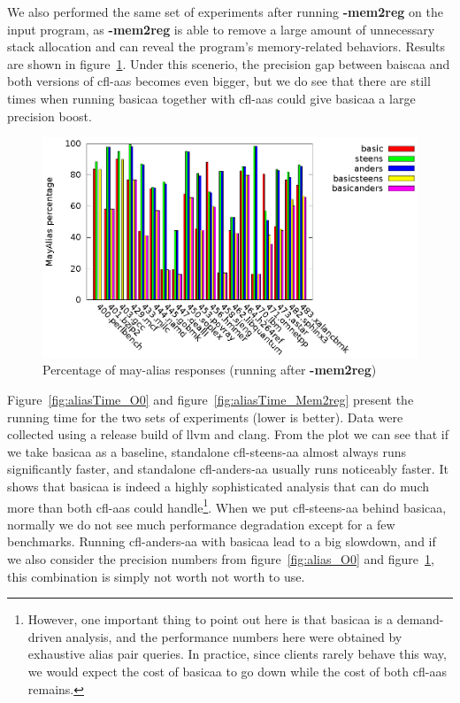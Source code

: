 \documentclass[10pt]{article}
\begin{document}
We also performed the same set of experiments after running \textbf{-mem2reg} on
the input program, as \textbf{-mem2reg} is able to remove a large amount of
unnecessary stack allocation and can reveal the program's memory-related
behaviors. Results are shown in
figure~\ref{fig:alias_Mem2reg}. Under this
scenerio, the precision gap between baiscaa and both versions of cfl-aas becomes
even bigger, but we do see that there are still times when running basicaa together
with cfl-aas could give basicaa a large precision boost.

\begin{figure}
  \centering
  \includegraphics[width=\linewidth]{result/alias/aliasMem2reg.eps}
  \caption{Percentage of may-alias responses (running after \textbf{-mem2reg})\label{fig:alias_Mem2reg}}
\end{figure}

Figure~\ref{fig:aliasTime_O0} and figure~\ref{fig:aliasTime_Mem2reg} present the
running time for the two sets of experiments (lower is better). Data were
collected using a release build of llvm and clang. From the plot we can see that if
we take basicaa as a baseline, standalone cfl-steens-aa almost always runs
significantly faster, and standalone cfl-anders-aa usually runs noticeably
faster. It shows that basicaa is indeed a highly sophisticated analysis that can
do much more than both cfl-aas could handle\footnote{However, one important
  thing to point out here is that basicaa is a demand-driven analysis, and the
  performance numbers here were obtained by exhaustive alias pair queries. In
  practice, since clients rarely behave this way, we would expect the cost of
  basicaa to go down while the cost of both cfl-aas remains. }. When we put cfl-steens-aa behind
basicaa, normally we do not see much performance degradation except for a few
benchmarks. Running cfl-anders-aa with basicaa lead to a big slowdown, and if we
also consider the precision numbers from figure~\ref{fig:alias_O0} and
figure~\ref{fig:alias_Mem2reg}, this combination is simply not worth  not worth
to use. 
\end{document}
